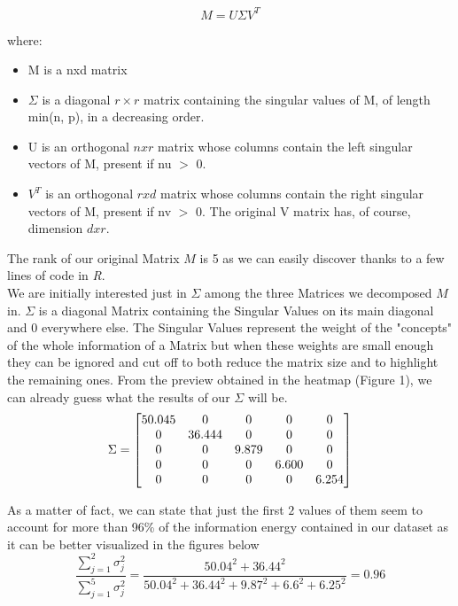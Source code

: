 \documentclass[10pt]{article}
\theoremstyle{plain}
\theoremstyle{definition}
\begin{document}
\begin{equation}
    M = U\Sigma V^T
\end{equation}

where:

\begin{itemize}
    \item M is a nxd matrix 
    \item $\Sigma$ is a diagonal $r\times r$ matrix containing the singular values of M, of length min(n, p), in a decreasing order.
    \item U is an orthogonal $nxr$ matrix whose columns contain the left singular vectors of M, present if nu $>$ 0.
    \item $V^T$ is an orthogonal $rxd$ matrix whose columns contain the right singular vectors of M, present if nv $>$ 0. The original V matrix has, of course, dimension $dxr$.
\end{itemize}

The rank of our original Matrix $M$ is 5 as we can easily discover thanks to a few lines of code in \textit{R}. \\

We are initially interested just in $\Sigma$ among the three Matrices we decomposed $M$ in.
$\Sigma$ is a diagonal Matrix containing the Singular Values on its main diagonal and $0$ everywhere else. 
The Singular Values represent the weight of the "concepts" of the whole information of a Matrix but when these weights are small enough they can be ignored and cut off to both reduce the matrix size and to highlight the remaining ones.
From the preview obtained in the heatmap (Figure 1), we can already guess what the results of our $\Sigma$ will be.
\begin{equation}
\Sigma = 
\begin{bmatrix}
$50.045$ & $0$ & $0$ & $0$ & $0$ \\ 
$0$ & $36.444$ & $0$ & $0$ & $0$ \\ 
$0$ & $0$ & $9.879$ & $0$ & $0$ \\ 
$0$ & $0$ & $0$ & $6.600$ & $0$ \\ 
$0$ & $0$ & $0$ & $0$ & $6.254$ \\ 
\end{bmatrix}
\end{equation}

As a matter of fact, we can state that just the first $2$ values of them seem to account for more than 96\% of the information energy contained in our dataset as it can be better visualized in the figures below
\begin{equation}
\frac{\sum_{j=1}^2{\sigma_j^2}}{\sum_{j=1}^5{\sigma_j^2}} = \frac{50.04^2 + 36.44^2}{50.04^2 + 36.44^2 + 9.87^2 + 6.6^2 + 6.25^2}  = 0.96
\end{equation}
\end{document}
